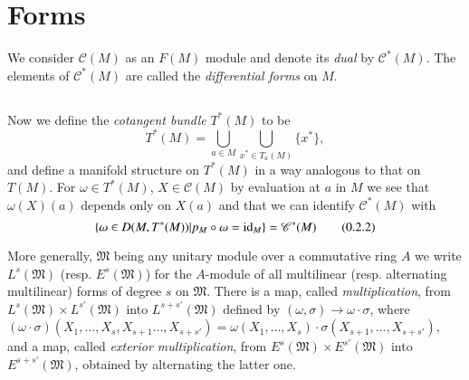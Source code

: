 \section{Forms}\label{chap0:sec2}

We consider $\mathscr{C}(M)$ as an $F(M)$ module and denote its {\em
  dual} by $\mathscr{C}^{\ast}(M)$. 
The \pageoriginale elements of
$\mathscr{C}^{\ast}(M)$ are called the {\em differential forms} on
$M$. 

\subsection{}\label{chap0:0.2.1}

Now we define the {\em cotangent bundle} $T^{\ast}(M)$ to be
$$T^{\ast}(M)=\bigcup\limits_{a\in M}\bigcup\limits_{x^{\ast}\in
  T_{a}(M)}\{x^{\ast}\},$$ 
and define a manifold structure on
$T^{\ast}(M)$ in a way analogous to that on $T(M)$. For $\omega \in
T^{\ast}(M)$, $X\in \mathscr{C}(M)$ by evaluation at $a$ in $M$ we see
that $\omega(X)(a)$ depends only on $X(a)$ and that we can identify
$\mathscr{C}^{\ast}(M)$ with 
\begin{equation*}\label{chap0:0.2.2}
\left\{\omega \in D(M,T^{\ast}(M))|p_{M}\circ \omega
=\operatorname{id}_{M}\right\}=\mathscr{C}^{\ast}(M)\tag{0.2.2} 
\end{equation*}

More generally, $\mathfrak{M}$ being any unitary module over a
commutative ring $A$ we write $L^{s}(\mathfrak{M})$
(resp. $E^{s}(\mathfrak{M})$) for the $A$-module of all multilinear
(resp. alternating multilinear) forms of degree $s$ on
$\mathfrak{M}$. There is a map, called {\em multiplication}, from
$L^{s}(\mathfrak{M})\times L^{s'}(\mathfrak{M})$ into
$L^{s+s'}(\mathfrak{M})$ defined by $(\omega,\sigma)\to \omega\cdot
\sigma$, where $(\omega\cdot
\sigma)(X_{1},\ldots,X_{s},X_{s+1}\ldots,X_{s+s'})=\omega
(X_{1},\ldots,X_{s})\cdot \sigma (X_{s+1},\ldots,X_{s+s'})$, and a
map, called {\em exterior multiplication}, from
$E^{s}(\mathfrak{M}) \times E^{s'}(\mathfrak{M})$ into
$E^{s+s'}(\mathfrak{M})$, obtained by alternating the latter one.

